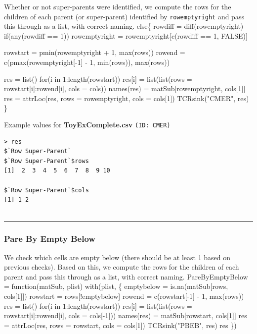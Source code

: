 \documentclass[a4paper]{article}
\begin{document}
Whether or not super-parents were identified, we compute the rows for
the children of each parent (or super-parent) identified by
\verb|rowemptyright| and pass this through as a list, with correct
naming.
\nwenddocs{}\endmoddef
else\{
  rowdiff = diff(rowemptyright)
  if(any(rowdiff == 1))
    rowemptyright = rowemptyright[c(rowdiff == 1, FALSE)]
  
  rowstart = pmin(rowemptyright + 1, max(rows))
  rowend = c(pmax(rowemptyright[-1] - 1, min(rows)), max(rows))
  
  res = list()
  for(i in 1:length(rowstart))
    res[i] = list(list(rows = rowstart[i]:rowend[i], cols = cols))
  names(res) = matSub[rowemptyright, cols[1]]
  res = attrLoc(res, rows = rowemptyright, cols = cols[1])
  TCRsink("CMER", res)
\}
\nwendcode{}\nwdocspar

Example values for \textbf{ToyExComplete.csv} \texttt{(ID: CMER)}
\begin{verbatim}
> res
$`Row Super-Parent`
$`Row Super-Parent`$rows
[1]  2  3  4  5  6  7  8  9 10

$`Row Super-Parent`$cols
[1] 1 2


\end{verbatim}
\vspace{-1.5em}
\noindent\rule{0.25\textwidth}{0.4pt}
\vspace{0.5em}

\subsubsection{Pare By Empty Below}
We check which cells are empty below (there should be at least 1 based
on previous checks). Based on this, we compute the rows for the
children of each parent and pass this through as a list, with correct
naming.
\nwenddocs{}\endmoddef
PareByEmptyBelow =
  function(matSub, plist)
  with(plist, \{
    emptybelow = is.na(matSub[rows, cols[1]])
    rowstart = rows[!emptybelow]
    rowend = c(rowstart[-1] - 1, max(rows))
    res = list()
    for(i in 1:length(rowstart))
      res[i] = list(list(rows = rowstart[i]:rowend[i], cols = cols[-1]))
    names(res) = matSub[rowstart, cols[1]]
    res = attrLoc(res, rows = rowstart, cols = cols[1])
    TCRsink("PBEB", res)
    res
  \})
\eatline
{}\nwendcode{}\nwdocspar
\end{document}
